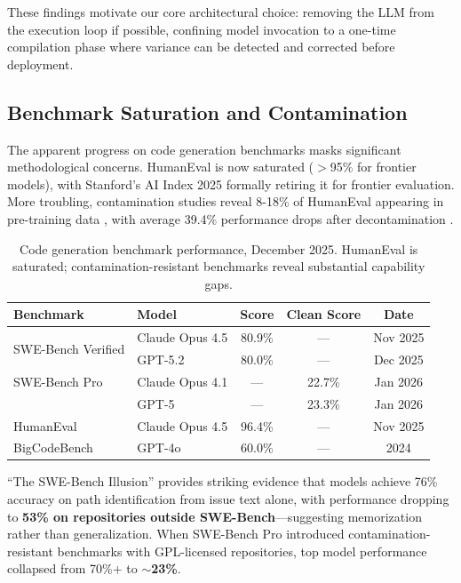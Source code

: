 \documentclass[11pt]{article}
\begin{document}
These findings motivate our core architectural choice: removing the LLM from the execution loop if possible, confining model invocation to a one-time compilation phase where variance can be detected and corrected before deployment.

\subsection{Benchmark Saturation and Contamination}

The apparent progress on code generation benchmarks masks significant methodological concerns. HumanEval is now saturated ($>$95\% for frontier models), with Stanford's AI Index 2025 formally retiring it for frontier evaluation. More troubling, contamination studies reveal 8-18\% of HumanEval appearing in pre-training data \citep{yang2023rethinking}, with average 39.4\% performance drops after decontamination \citep{xu2024contamination}.

\begin{table}[ht]
\centering
\caption{Code generation benchmark performance, December 2025. HumanEval is saturated; contamination-resistant benchmarks reveal substantial capability gaps.}
\label{tab:benchmarks}
\begin{tabular}{llccc}
\toprule
Benchmark & Model & Score & Clean Score & Date \\
\midrule
\multirow{2}{*}{SWE-Bench Verified} & Claude Opus 4.5 & 80.9\% & --- & Nov 2025 \\
 & GPT-5.2 & 80.0\% & --- & Dec 2025 \\
\midrule
SWE-Bench Pro & Claude Opus 4.1 & --- & 22.7\% & Jan 2026 \\
 & GPT-5 & --- & 23.3\% & Jan 2026 \\
\midrule
HumanEval & Claude Opus 4.5 & 96.4\% & --- & Nov 2025 \\
\midrule
BigCodeBench & GPT-4o & 60.0\% & --- & 2024 \\
\bottomrule
\end{tabular}
\end{table}

``The SWE-Bench Illusion'' \citep{shi2025swebenchillusion} provides striking evidence that models achieve 76\% accuracy on path identification from issue text alone, with performance dropping to \textbf{53\% on repositories outside SWE-Bench}—suggesting memorization rather than generalization. When SWE-Bench Pro introduced contamination-resistant benchmarks with GPL-licensed repositories, top model performance collapsed from 70\%+ to \textbf{$\sim$23\%}.
\end{document}
